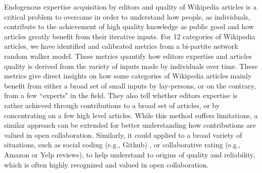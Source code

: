 Endogenous expertise acquisition by editors and quality of Wikipedia articles is a critical problem to overcome in order to understand how people, as individuals, contribute to the achievement of high quality knowledge as public good and how articles greatly benefit from their iterative inputs. For 12 categories of Wikipedia articles, we have identified and calibrated metrics from a {bi-partite network random walker} model. These metrics quantify how editors expertise and articles quality is derived from the variety of inputs made by individuals over time. These metrics give direct insights on how some categories of Wikipedia articles mainly benefit from either a broad set of small inputs by lay-persons, or on the contrary, from a few ``experts" in the field. They also tell whether editors expertise is rather achieved through contributions to a broad set of articles, or by concentrating on a few high level articles. While this method suffers limitations, a similar approach can be extended for better understanding how contributions are valued in open collaboration. Similarly, it could applied to a broad variety of situations, such as social coding (e.g., Github) , or collaborative rating (e.g., Amazon or Yelp reviews), to help understand to origins of quality and reliability, which is often highly recognized and valued in open collaboration.
